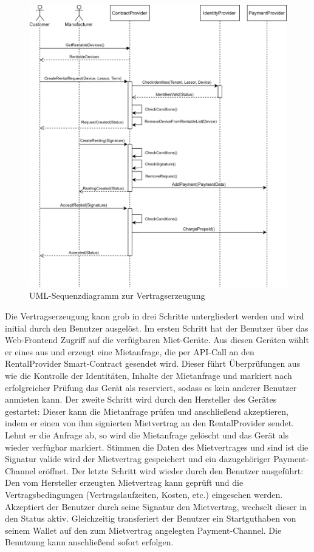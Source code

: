 \begin{figure}[h]
 \centering
 \includegraphics[width=1.0\textwidth]{gfx/UML_Seq-ContractCreation.png}
 \caption{UML-Sequenzdiagramm zur Vertragserzeugung}
 \label{fig:chapter07:creation}
\end{figure}
Die Vertragserzeugung kann grob in drei Schritte untergliedert werden und wird initial durch den Benutzer ausgelöst. Im ersten Schritt hat der Benutzer über das Web-Frontend Zugriff auf die verfügbaren Miet-Geräte. Aus diesen Geräten wählt er eines aus und erzeugt eine Mietanfrage, die per API-Call an den RentalProvider Smart-Contract gesendet wird. Dieser führt Überprüfungen aus wie die Kontrolle der Identitäten, Inhalte der Mietanfrage und markiert nach erfolgreicher Prüfung das Gerät als reserviert, sodass es kein anderer Benutzer anmieten kann. Der zweite Schritt wird durch den Hersteller des Gerätes gestartet: Dieser kann die Mietanfrage prüfen und anschließend akzeptieren, indem er einen von ihm signierten Mietvertrag an den RentalProvider sendet. Lehnt er die Anfrage ab, so wird die Mietanfrage gelöscht und das Gerät als wieder verfügbar markiert. Stimmen die Daten des Mietvertrages und sind ist die Signatur valide wird der Mietvertrag gespeichert und ein dazugehöriger Payment-Channel eröffnet. Der letzte Schritt wird wieder durch den Benutzer ausgeführt: Den vom Hersteller erzeugten Mietvertrag kann geprüft und die Vertragsbedingungen (Vertragslaufzeiten, Kosten, etc.) eingesehen werden. Akzeptiert der Benutzer durch seine Signatur den Mietvertrag, wechselt dieser in den Status aktiv. Gleichzeitig transferiert der Benutzer ein Startguthaben von seinem Wallet auf den zum Mietvertrag angelegten Payment-Channel. Die Benutzung kann anschließend sofort erfolgen.

